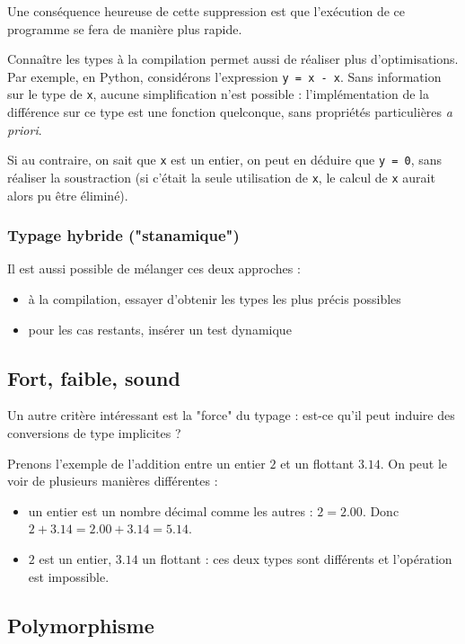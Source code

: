 Une conséquence heureuse de cette suppression est que l'exécution de ce
programme se fera de manière plus rapide.

Connaître les types à la compilation permet aussi de réaliser plus
d'optimisations. Par exemple, en Python, considérons l'expression \texttt{y = x
- x}. Sans information sur le type de \texttt{x}, aucune simplification n'est
possible : l'implémentation de la différence sur ce type est une fonction
quelconque, sans propriétés particulières \emph{a priori}.

Si au contraire, on sait que \texttt{x} est un entier, on peut en déduire que
\texttt{y = 0}, sans réaliser la soustraction (si c'était la seule utilisation
de \texttt{x}, le calcul de \texttt{x} aurait alors pu être éliminé).

\subsubsection{Typage hybride ("stanamique")}

Il est aussi possible de mélanger ces deux approches :

\begin{itemize}
\item
  à la compilation, essayer d'obtenir les types les plus précis
  possibles
\item
  pour les cas restants, insérer un test dynamique
\end{itemize}

\subsection{Fort, faible, sound}

Un autre critère intéressant est la "force" du typage : est-ce qu'il peut
induire des conversions de type implicites ?

Prenons l'exemple de l'addition entre un entier $2$ et un flottant $3.14$. On
peut le voir de plusieurs manières différentes :

\begin{itemize}
\item
  un entier est un nombre décimal comme les autres : $2 = 2.00$. Donc
  $2 + 3.14 = 2.00 + 3.14 = 5.14$.
\item
  $2$ est un entier, $3.14$ un flottant : ces deux types sont différents et
  l'opération est impossible.
\end{itemize}

\subsection{Polymorphisme}

